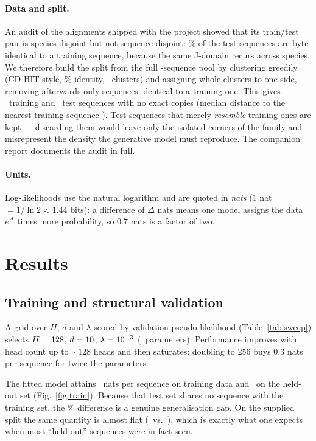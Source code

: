 \documentclass[10pt,twocolumn,a4paper]{article}
\begin{document}
\paragraph{Data and split.} An audit of the alignments shipped with the project showed that its
train/test pair is species-disjoint but not sequence-disjoint: \OrigCopies\% of the test sequences
are byte-identical to a training sequence, because the same J-domain recurs across species. We
therefore build the split from the full \NsuperSet-sequence pool by clustering greedily
(CD-HIT style, \SplitIdent\% identity, \NclustTot\ clusters) and assigning whole clusters to one
side, removing afterwards only sequences identical to a training one. This gives \Mtrain\ training
and \Mtest\ test sequences with no exact copies (median distance to the nearest training sequence
\CleanNNmed). Test sequences that merely \emph{resemble} training ones are kept --- discarding
them would leave only the isolated corners of the family and misrepresent the density the
generative model must reproduce. The companion report documents the audit in full.

\paragraph{Units.} Log-likelihoods use the natural logarithm and are quoted in \emph{nats}
($1$ nat $=1/\ln2\approx1.44$ bits): a difference of $\Delta$ nats means one model assigns the
data $e^\Delta$ times more probability, so $0.7$ nats is a factor of two.

\section{Results}

\subsection{Training and structural validation}
A grid over $H$, $d$ and $\lambda$ scored by validation pseudo-likelihood
(Table~\ref{tab:sweep}) selects $H=128$, $d=10$, $\lambda=10^{-3}$ (\Nparams\
parameters). Performance improves with head count up to ${\sim}128$ heads and then saturates:
doubling to 256 buys $0.3$ nats per sequence for twice the parameters.

The fitted model attains \NLPLtrain\ nats per sequence on training data and \NLPLtest\ on the
held-out set (Fig.~\ref{fig:train}). Because that test set shares no sequence with the training
set, the \NLPLgapPct\% difference is a genuine generalisation gap. On the supplied split the same
quantity is almost flat (\CmpNLPLtest\ vs.\ \CmpValNLPL), which is exactly what one expects when
most ``held-out'' sequences were in fact seen.
\end{document}
